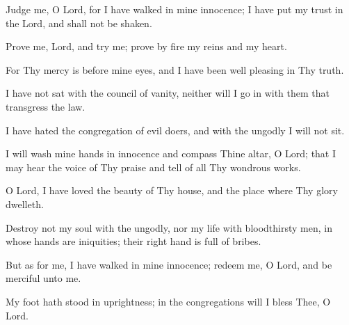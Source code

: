 Judge me, O Lord, for I have walked in mine innocence; I have put my trust in the Lord, and shall not be shaken.

Prove me, Lord, and try me; prove by fire my reins and my heart.

For Thy mercy is before mine eyes, and I have been well pleasing in Thy truth.

I have not sat with the council of vanity, neither will I go in with them that transgress the law.

I have hated the congregation of evil doers, and with the ungodly I will not sit.

I will wash mine hands in innocence and compass Thine altar, O Lord; that I may hear the voice of Thy praise and tell of all Thy wondrous works.

O Lord, I have loved the beauty of Thy house, and the place where Thy glory dwelleth.

Destroy not my soul with the ungodly, nor my life with bloodthirsty men, in whose hands are iniquities; their right hand is full of bribes.

But as for me, I have walked in mine innocence; redeem me, O Lord, and be merciful unto me.

My foot hath stood in uprightness; in the congregations will I bless Thee, O Lord.
